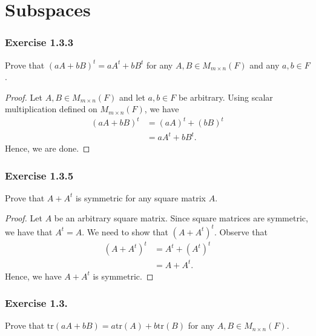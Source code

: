 \section{Subspaces}

\subsubsection{Exercise 1.3.3}

Prove that \( (aA + bB)^{t} = a A^{t} + b B^{t}  \) for any \( A,B \in M_{m \times n } (F) \) and any \( a,b \in F  \).

\begin{proof}
Let \( A , B \in M_{m \times n } (F ) \) and let \( a, b \in F  \) be arbitrary. Using scalar multiplication defined on \( M_{m \times n }(F ) \), we have 
\begin{align*}
    (aA + bB )^{t} &= (aA)^{t} + (bB)^{t}  \\
                   &= a A^{t} + b B^{t}.
\end{align*}
Hence, we are done.
\end{proof}

\subsubsection{Exercise 1.3.5} 
Prove that \( A + A^{t}  \) is symmetric for any square matrix \( A  \).

\begin{proof}
Let \( A  \) be an arbitrary square matrix. Since square matrices are symmetric, we have that \( A^{t} = A  \). We need to show that \( (A + A^{t})^{t}  \). Observe that 
\begin{align*}
    (A + A^{t})^{t} &= A^{t} + (A^{t})^{t} \\
                    &= A + A^{t}.
\end{align*}
Hence, we have \( A + A^{t}  \) is symmetric.
\end{proof}

\subsubsection{Exercise 1.3.}

Prove that \( \text{tr}(aA + bB) = a \text{tr}(A) + b \text{tr}(B) \) for any \( A,B \in M_{n \times n }(F) \).

